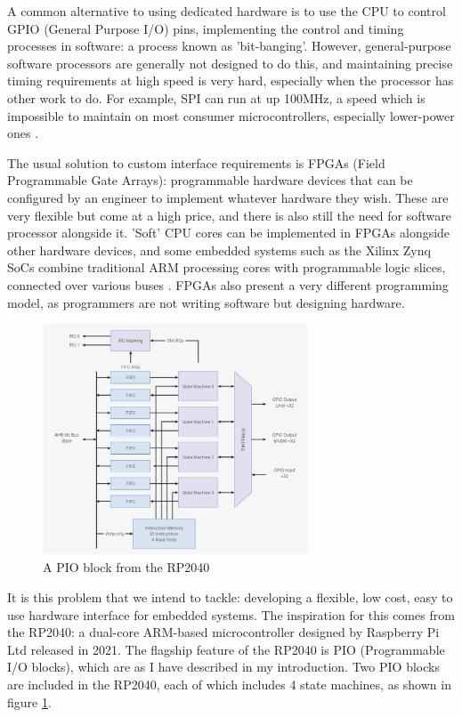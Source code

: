 \documentclass[a4paper,fleqn,12pt]{article}
\begin{document}
A common alternative to using dedicated hardware is to use the CPU to control GPIO (General Purpose I/O) pins, implementing the control and timing processes in software: a process known as 'bit-banging'. However, general-purpose software processors are generally not designed to do this, and maintaining precise timing requirements at high speed is very hard, especially when the processor has other work to do. For example, SPI can run at up 100MHz, a speed which is impossible to maintain on most consumer microcontrollers, especially lower-power ones \cite{picosdk}.

The usual solution to custom interface requirements is FPGAs (Field Programmable Gate Arrays): programmable hardware devices that can be configured by an engineer to implement whatever hardware they wish. These are very flexible but come at a high price, and there is also still the need for software processor alongside it. 'Soft' CPU cores can be implemented in FPGAs alongside other hardware devices, and some embedded systems such as the Xilinx Zynq SoCs combine traditional ARM processing cores with programmable logic slices, connected over various buses \cite{zynq}. FPGAs also present a very different programming model, as programmers are not writing software but designing hardware.


\begin{figure}[b!]
    \centering
    \includegraphics[width=0.7\textwidth]{../img/pio-block.jpg}
    \caption{A PIO block from the RP2040 \cite{rp2040}}
    \label{fig:pio-block}
\end{figure}


It is this problem that we intend to tackle: developing a flexible, low cost, easy to use hardware interface for embedded systems. The inspiration for this comes from the RP2040: a dual-core ARM-based microcontroller designed by Raspberry Pi Ltd released in 2021. The flagship feature of the RP2040 is PIO (Programmable I/O blocks), which are as I have described in my introduction. Two PIO blocks are included in the RP2040, each of which includes 4 state machines, as shown in figure \ref{fig:pio-block}.
\end{document}
